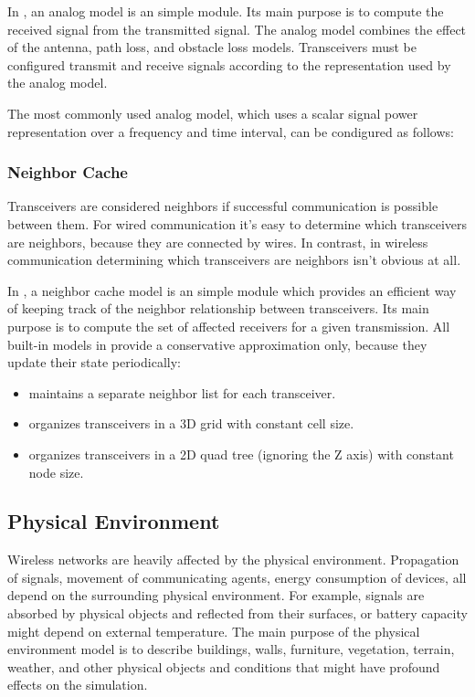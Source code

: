 In \inet, an analog model is an \omnet simple module. Its main purpose is to compute the received signal from the transmitted signal. The analog model combines the effect of the antenna, path loss, and obstacle loss models. Transceivers must be configured transmit and receive signals according to the representation used by the analog model.

The most commonly used analog model, which uses a scalar signal power representation over a frequency and time interval, can be condigured as follows:


\subsubsection*{Neighbor Cache}

Transceivers are considered neighbors if successful communication is possible between them. For wired communication it’s easy to determine which transceivers are neighbors, because they are connected by wires. In contrast, in wireless communication determining which transceivers are neighbors isn’t obvious at all.

In \inet, a neighbor cache model is an \omnet simple module which provides an efficient way of keeping track of the neighbor relationship between transceivers. Its main purpose is to compute the set of affected receivers for a given transmission. All built-in models in \inet provide a conservative approximation only, because they update their state periodically:

\begin{itemize}
        \item {} maintains a separate neighbor list for each transceiver.
        \item {} organizes transceivers in a 3D grid with constant cell size.
        \item {} organizes transceivers in a 2D quad tree (ignoring the Z axis) with constant node size.
\end{itemize}


\subsection{Physical Environment}
\label{subsec:physical-environment}
Wireless networks are heavily affected by the physical environment. Propagation of signals, movement of communicating agents, energy consumption of devices, all depend on the surrounding physical environment. For example, signals are absorbed by physical objects and reflected from their surfaces, or battery capacity might depend on external temperature. The main purpose of the physical environment model is to describe buildings, walls, furniture, vegetation, terrain, weather, and other physical objects and conditions that might have profound effects on the simulation.

